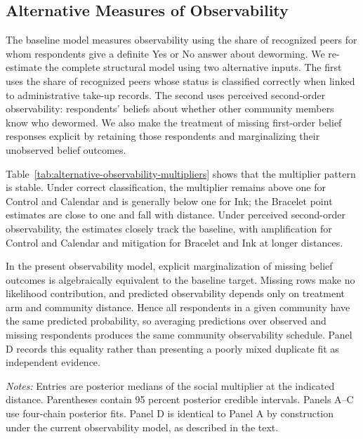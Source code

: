 \documentclass[12pt]{article}
\begin{document}
\providecommand{\StructuralRobustnessPath}{appendix/structural-robustness}

\subsection{Alternative Measures of Observability}
\label{app:alternative-observability}

The baseline model measures observability using the share of recognized peers
for whom respondents give a definite Yes or No answer about deworming. We
re-estimate the complete structural model using two alternative inputs. The
first uses the share of recognized peers whose status is classified correctly
when linked to administrative take-up records. The second uses perceived
second-order observability: respondents' beliefs about whether other community
members know who dewormed. We also make the treatment of missing first-order
belief responses explicit by retaining those respondents and marginalizing
their unobserved belief outcomes.

Table~\ref{tab:alternative-observability-multipliers} shows that the multiplier
pattern is stable. Under correct classification, the multiplier remains above
one for Control and Calendar and is generally below one for Ink; the Bracelet
point estimates are close to one and fall with distance. Under perceived
second-order observability, the estimates closely track the baseline, with
amplification for Control and Calendar and mitigation for Bracelet and Ink at
longer distances.

In the present observability model, explicit marginalization of missing belief
outcomes is algebraically equivalent to the baseline target. Missing rows make
no likelihood contribution, and predicted observability depends only on
treatment arm and community distance. Hence all respondents in a given
community have the same predicted probability, so averaging predictions over
observed and missing respondents produces the same community observability
schedule. Panel D records this equality rather than presenting a poorly mixed
duplicate fit as independent evidence.

\begin{table}[htbp]
  \centering
  \small
  \caption{Social multipliers under alternative measures of observability}
  \label{tab:alternative-observability-multipliers}
  \begin{threeparttable}
    
    \begin{tablenotes}\footnotesize
      \item \textit{Notes:} Entries are posterior medians of the social
      multiplier at the indicated distance. Parentheses contain 95 percent
      posterior credible intervals. Panels A--C use four-chain posterior fits.
      Panel D is identical to Panel A by construction under the current
      observability model, as described in the text.
    \end{tablenotes}
  \end{threeparttable}
\end{table}
\end{document}
